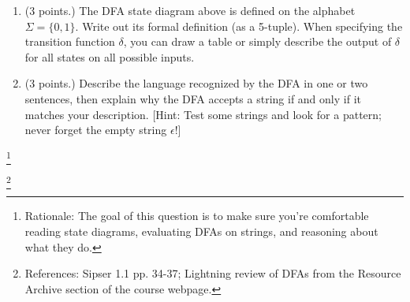\documentclass[letterpaper,11pt,twoside]{article}
\theoremstyle{plain}
\theoremstyle{definition}
\theoremstyle{remark}
\theoremstyle{restate}
\newcommand\blfootnote[1]{%
  \begingroup
  \renewcommand\thefootnote{}\footnote{#1}%
  \addtocounter{footnote}{-1}%
  \endgroup
}
\begin{document}
\begin{enumerate}
    \item (3 points.) The DFA state diagram above is defined on the alphabet $\Sigma = \{0,1\}$. Write out its formal definition (as a 5-tuple). When specifying the transition function $\delta$, you can draw a table or simply describe the output of $\delta$ for all states on all possible inputs. 
    
    \item (3 points.) Describe the language recognized by the DFA in one or two sentences, then explain why the DFA accepts a string if and only if it matches your description. [Hint: Test some strings and look for a pattern; never forget the empty string $\epsilon$!]
    
    \end{enumerate}
    
\blfootnote{ Rationale: The goal of this question is to make sure you're comfortable reading state diagrams, evaluating DFAs on strings, and reasoning about what they do. }
\blfootnote{ References: Sipser 1.1 pp. 34-37; Lightning review of DFAs from the Resource Archive section of the course webpage.}
    
\clearpage
\end{document}
